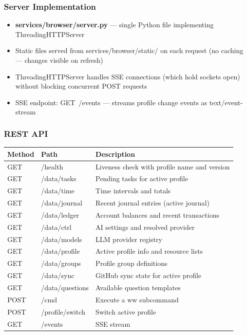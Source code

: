 \documentclass[11pt, a4paper, DIV=14]{scrartcl}
\renewcommand{\texttt}[1]{{\ttfamily\fontsize{8.5}{10.5}\selectfont\color{BabbNavy}#1}}
\begin{document}
\subsubsection{Server Implementation}\label{server-implementation}

\begin{itemize}
\tightlist
\item
  \textbf{\texttt{services/browser/server.py}} --- single Python file
  implementing \texttt{ThreadingHTTPServer}
\item
  Static files served from \texttt{services/browser/static/} on each
  request (no caching --- changes visible on refresh)
\item
  \texttt{ThreadingHTTPServer} handles SSE connections (which hold
  sockets open) without blocking concurrent POST requests
\item
  SSE endpoint: \texttt{GET\ /events} --- streams profile change events
  as \texttt{text/event-stream}
\end{itemize}

\subsubsection{REST API}\label{rest-api}

{\def\LTcaptype{none} %
\begin{longtable}[]{@{}lll@{}}
\toprule\noalign{}
Method & Path & Description \\
\midrule\noalign{}
\endhead
\bottomrule\noalign{}
\endlastfoot
GET & /health & Liveness check with profile name and version \\
GET & /data/tasks & Pending tasks for active profile \\
GET & /data/time & Time intervals and totals \\
GET & /data/journal & Recent journal entries (active journal) \\
GET & /data/ledger & Account balances and recent transactions \\
GET & /data/ctrl & AI settings and resolved provider \\
GET & /data/models & LLM provider registry \\
GET & /data/profile & Active profile info and resource lists \\
GET & /data/groups & Profile group definitions \\
GET & /data/sync & GitHub sync state for active profile \\
GET & /data/questions & Available question templates \\
POST & /cmd & Execute a ww subcommand \\
POST & /profile/switch & Switch active profile \\
GET & /events & SSE stream \\
\end{longtable}
}
\end{document}
